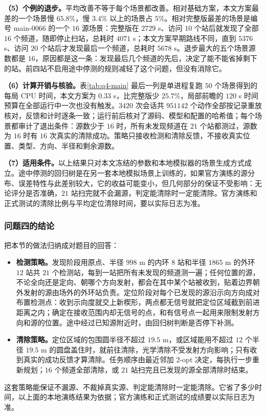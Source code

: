 \textbf{（5）个例的退步。}平均改善不等于每个场景都改善。相对基础方案，本文方案最差的一个场景慢 $65.8\%$，慢 $3.4\%$ 以上的场景占 $5\%$。相对完整版最差的场景是编号 main-0066 的一个 $16$ 源场景：完整版在 $2729$ s、访问 $10$ 个站后就发现了全部 $16$ 个频道，随即停止扫站，总耗时 $4071$ s；本文方案早期路线不同，直到 $5376$ s、访问 $20$ 个站后才发现最后一个频道，总耗时 $5678$ s。退步最大的五个场景源数都是 $16$，原因都是这一条：发现最后几个频道的先后，决定了能不能省掉剩下的站。前四站不启用途中停测的规则减轻了这个问题，但没有消除它。

\textbf{（6）计算开销与核验。}表\ref{tab:q4-main} 最后一列是单进程复跑 $50$ 个场景得到的每局 CPU 时间，本文方案为 $0.33$ s，比完整版少 $25.7\%$，局部前瞻的 $120$ s 时间预算在全部运行中一次也没有触发。$3420$ 次会话共 $951142$ 个动作全部按记录重放核对，反馈和计时逐条一致；运行前后核对了源码、模型和配置的哈希值；每个场景都审计了退出条件：源数少于 $16$ 时，所有未发现频道在 $21$ 个站都测过，源数为 $16$ 时有 $16$ 次真实的清除成功。策略只接收检测和清除反馈，不接收真实位置、类型、方向、半径和剩余源数。

\textbf{（7）适用条件。}以上结果只对本文冻结的参数和本地模拟器的场景生成方式成立。途中停测的回归树是在另一套本地模拟场景上训练的，如果官方演练的源分布、误差特性与此差别较大，它的收益可能变小，但几何部分的保证不受影响：无论评分是否准确，$21$ 站扫完就不会漏源，判定能清除时一定能清除。官方演练和正式测试的清除比例与平均定位清除时间，要以实际日志为准。

\subsubsection{问题四的结论}\label{sec:q4-5}

把本节的做法归纳成对题目的回答：

\begin{itemize}
\item \textbf{检测策略。}发现阶段用原点、半径 $998$ m 的内环 $8$ 站和半径 $1865$ m 的外环 $12$ 站共 $21$ 个检测站，每到一站把所有未发现的频道测一遍；任何位置的源，不论全向还是定向、朝哪个方向发射，都会在其中某个站被收到，贴着边界朝外发射的源由场外的外环站负责。定位阶段对每个已发现的源沿示向方向成对布置检测点：收到示向度就交上新楔形，两点都无信号就把定位区域截到前进距离之内；确定在接收范围内却无信号的点，和有信号点一起用来限制发射方向和源的位置。途中经过已知源附近时，由回归树判断是否停下补测。
\item \textbf{清除策略。}定位区域的包围圆半径不超过 $19.5$ m，或区域能用不超过 $12$ 个半径 $19.5$ m 的圆盘盖住时，就前往清除，光学清除不受发射方向影响；只有收到真实的成功反馈才算清除。任务顺序由最近邻加 2-opt 决定，每执行一步重新规划；$16$ 个频道全部清除，或 $21$ 站扫完且已发现的源全部清除时结束。
\end{itemize}

这套策略能保证不漏源、不裁掉真实源、判定能清除时一定能清除。它省了多少时间，以上面的本地演练结果为依据；官方演练和正式测试的成绩要以实际日志为准。

